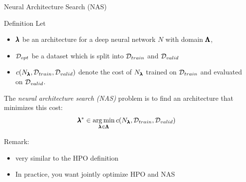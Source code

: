 \begin{frame}[c]{Neural Architecture Search (NAS)}

\begin{block}{Definition}
	Let 
	\begin{itemize}
		\item $\pmb{\lambda}$ be \alert{an architecture for a deep neural network $N$} with domain $\pmb{\Lambda}$,
		\item $\mathcal{D}_{opt}$ be a dataset which is split into $\mathcal{D}_{train}$ and $\mathcal{D}_{valid}$ 
		\item $c(N_{\pmb{\lambda}}, \mathcal{D}_{train}, \mathcal{D}_{valid})$ denote the cost of $N_{\pmb{\lambda}}$ trained on $\mathcal{D}_{train}$ and evaluated on $\mathcal{D}_{valid}$.
	\end{itemize}
	The \emph{neural architecture search (NAS)} problem is to find an architecture that minimizes this cost:
	\begin{equation}
	\pmb{\lambda}^* \in \operatorname*{arg\,min}_{\pmb{\lambda} \in \pmb{\Lambda}} c(N_{\pmb{\lambda}}, \mathcal{D}_{train}, \mathcal{D}_{valid}) \nonumber  
	\end{equation}
\end{block}

\pause
\smallskip
Remark:
\begin{itemize}
	\item very similar to the HPO definition
	\pause
	\item In practice, you want jointly optimize HPO and NAS~
\end{itemize}

\end{frame}
